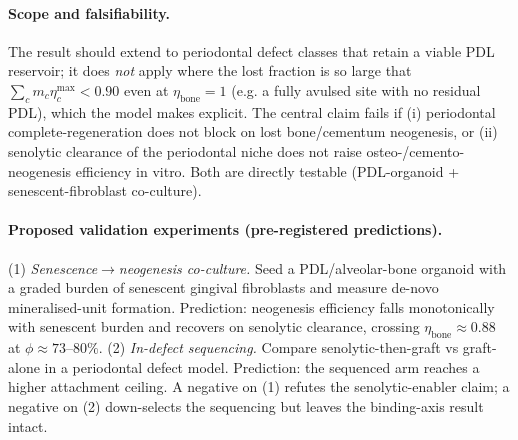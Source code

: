 \documentclass[11pt,a4paper]{article}
\begin{document}
\paragraph{Scope and falsifiability.} The result should extend to periodontal defect
classes that retain a viable PDL reservoir; it does \emph{not} apply where the lost
fraction is so large that $\sum_c m_c\eta_c^{\max}<0.90$ even at $\eta_{\text{bone}}=1$
(e.g. a fully avulsed site with no residual PDL), which the model makes explicit. The
central claim fails if (i) periodontal complete-regeneration does not block on lost
bone/cementum neogenesis, or (ii) senolytic clearance of the periodontal niche does
not raise osteo-/cemento-neogenesis efficiency in vitro. Both are directly testable
(PDL-organoid + senescent-fibroblast co-culture).
\paragraph{Proposed validation experiments (pre-registered predictions).}
(1) \emph{Senescence$\to$neogenesis co-culture.} Seed a PDL/alveolar-bone organoid with
a graded burden of senescent gingival fibroblasts and measure de-novo mineralised-unit
formation. Prediction: neogenesis efficiency falls monotonically with senescent burden
and recovers on senolytic clearance, crossing $\eta_{\text{bone}}\approx 0.88$ at
$\phi\approx 73$--$80\%$. (2) \emph{In-defect sequencing.} Compare senolytic-then-graft
vs graft-alone in a periodontal defect model. Prediction: the sequenced arm reaches a
higher attachment ceiling. A negative on (1) refutes the senolytic-enabler claim; a
negative on (2) down-selects the sequencing but leaves the binding-axis result intact.
\end{document}
